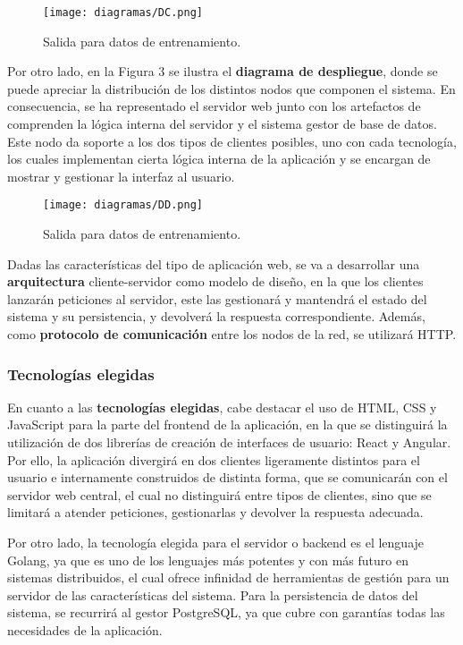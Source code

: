 \documentclass[11pt, a4paper, titlepage]{article}
\begin{document}
\begin{figure}[h!]
    \centering
    \texttt{[image: diagramas/DC.png]}
    \caption{Salida para datos de entrenamiento.}
\end{figure}


Por otro lado, en la Figura 3 se ilustra el \textbf{diagrama de despliegue}, donde se puede apreciar la distribución de los distintos nodos que componen el sistema. En consecuencia, se ha representado el servidor web junto con los artefactos de comprenden la lógica interna del servidor y el sistema gestor de base de datos. Este nodo da soporte a los dos tipos de clientes posibles, uno con cada tecnología, los cuales implementan cierta lógica interna de la aplicación y se encargan de mostrar y gestionar la interfaz al usuario. 

\begin{figure}[h!]
    \centering
    \texttt{[image: diagramas/DD.png]}
    \caption{Salida para datos de entrenamiento.}
\end{figure}

Dadas las características del tipo de aplicación web, se va a desarrollar una \textbf{arquitectura} cliente-servidor como modelo de diseño, en la que los clientes lanzarán peticiones al servidor, este las gestionará y mantendrá el estado del sistema y su persistencia, y devolverá la respuesta correspondiente. Además, como \textbf{protocolo de comunicación} entre los nodos de la red, se utilizará HTTP.

\subsubsection{Tecnologías elegidas}

En cuanto a las \textbf{tecnologías elegidas}, cabe destacar el uso de HTML, CSS y JavaScript para la parte del frontend de la aplicación, en la que se distinguirá la utilización de dos librerías de creación de interfaces de usuario: React y Angular. Por ello, la aplicación divergirá en dos clientes ligeramente distintos para el usuario e internamente construidos de distinta forma, que se comunicarán con el servidor web central, el cual no distinguirá entre tipos de clientes, sino que se limitará a atender peticiones, gestionarlas y devolver la respuesta adecuada. \newline

Por otro lado, la tecnología elegida para el servidor o backend es el lenguaje Golang, ya que es uno de los lenguajes más potentes y con más futuro en sistemas distribuidos, el cual ofrece infinidad de herramientas de gestión para un servidor de las características del sistema. Para la persistencia de datos del sistema, se recurrirá al gestor PostgreSQL, ya que cubre con garantías todas las necesidades de la aplicación. \newline
\end{document}
